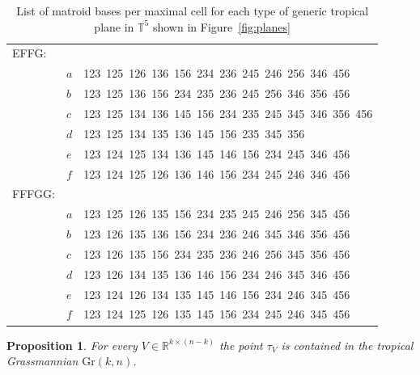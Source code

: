 \documentclass[11pt,a4paper]{amsart}
\newcommand{\RR}{{\mathbb{R}}}
\newcommand{\TT}{{\mathbb{T}}}
\newcommand{\Gr}[2]{{\mathrm{Gr}(#1,#2)}}
\theoremstyle{plain}
\newtheorem{proposition}[theorem]{Proposition}
\theoremstyle{definition}
\begin{document}
\begin{table}
\begin{tabular}{lll}
EFFG:\\
&$a$&123\ 125\ 126\ 136\ 156\ 234\ 236\ 245\ 246\ 256\ 346\ 456\\
&$b$&123\ 125\ 136\ 156\ 234\ 235\ 236\ 245\ 256\ 346\ 356\ 456\\
&$c$&123\ 125\ 134\ 136\ 145\ 156\ 234\ 235\ 245\ 345\ 346\ 356\ 456\\
&$d$&123\ 125\ 134\ 135\ 136\ 145\ 156\ 235\ 345\ 356\\
&$e$&123\ 124\ 125\ 134\ 136\ 145\ 146\ 156\ 234\ 245\ 346\ 456\\
&$f$&123\ 124\ 125\ 126\ 136\ 146\ 156\ 234\ 245\ 246\ 346\ 456\\
\addlinespace

FFFGG:\\
&$a$&123\ 125\ 126\ 135\ 156\ 234\ 235\ 245\ 246\ 256\ 345\ 456\\
&$b$&123\ 126\ 135\ 136\ 156\ 234\ 236\ 246\ 345\ 346\ 356\ 456\\
&$c$&123\ 126\ 135\ 156\ 234\ 235\ 236\ 246\ 256\ 345\ 356\ 456\\
&$d$&123\ 126\ 134\ 135\ 136\ 146\ 156\ 234\ 246\ 345\ 346\ 456\\
&$e$&123\ 124\ 126\ 134\ 135\ 145\ 146\ 156\ 234\ 246\ 345\ 456\\
&$f$&123\ 124\ 125\ 126\ 135\ 145\ 156\ 234\ 245\ 246\ 345\ 456
\end{tabular}
% 
\caption{List of matroid bases per maximal cell for each type of generic tropical plane in $\TT^5$
  shown in Figure~\ref{fig:planes}}
\label{tab:planes}
\end{table}

\begin{proposition}\label{prop:in-Grassmannian}
  For every $V\in \RR^{k\times(n-k)}$ the point $\tau_V$ is contained in the tropical Grassmannian $\Gr kn$.
\end{proposition}
\end{document}
